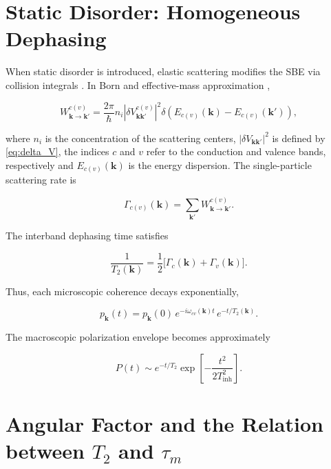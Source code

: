 \section{Static Disorder: Homogeneous Dephasing}

When static disorder is introduced, elastic scattering modifies the SBE via collision integrals \cite{HaugKoch2009,Mahan2000}. In Born \cite{AshcroftMermin,Mahan2000} and effective-mass approximation  \cite{PhysRev.97.869},

\begin{equation}
W_{\mathbf{k}\to\mathbf{k}'}^{c(v)}
=
\frac{2\pi}{\hbar} n_i |\delta V_{\mathbf{k}\mathbf{k}'}^{c(v)}|^2
\delta(E_{c(v)}(\mathbf{k})-E_{c(v)}(\mathbf{k}')),
\end{equation}

where $n_i$ is the concentration of the scattering centers, $|\delta V_{\mathbf{k}\mathbf{k}'}|^2$ is defined by \ref{eq:delta_V}, the indices $c$ and $v$ refer to the conduction and valence bands, respectively and $E_{c(v)}(\mathbf{k})$ is the energy dispersion. The single-particle scattering rate is

\begin{equation}
\Gamma_{c(v)}(\mathbf{k})=\sum_{\mathbf{k}'} W_{\mathbf{k}\to\mathbf{k}'}^{c(v)}.
\label{eq:gamma_def}
\end{equation}

The interband dephasing time satisfies \cite{Peropadre_2013}

\begin{equation}
\frac{1}{T_2(\mathbf{k})}
=
\frac{1}{2}\big[\Gamma_c(\mathbf{k})+\Gamma_v(\mathbf{k})\big].
\label{eq:t2_gamma}
\end{equation}

Thus, each microscopic coherence decays exponentially,

\begin{equation}
p_{\mathbf{k}}(t)=p_{\mathbf{k}}(0)\,e^{-i\omega_{cv}(\mathbf{k})t}\,e^{-t/T_2(\mathbf{k})}.
\end{equation}

The macroscopic polarization envelope becomes approximately

\begin{equation}
P(t)\sim e^{-t/T_2}\exp\!\left[-\frac{t^2}{2T_{\mathrm{inh}}^2}\right].
\end{equation}




\section{Angular Factor and the Relation between $T_2$ and $\tau_m$}

